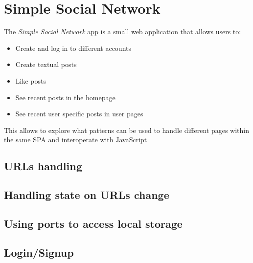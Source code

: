 \section{Simple Social Network}
The \textit{Simple Social Network} app is a small web application that allows users to:
\begin{itemize}
    \item Create and log in to different accounts
    \item Create textual posts
    \item Like posts
    \item See recent posts in the homepage
    \item See recent user specific posts in user pages
\end{itemize}
This allows to explore what patterns can be used to handle different pages within the same SPA and interoperate with JavaScript

\subsection{URLs handling}

\subsection{Handling state on URLs change}

\subsection{Using ports to access local storage}

\subsection{Login/Signup}
